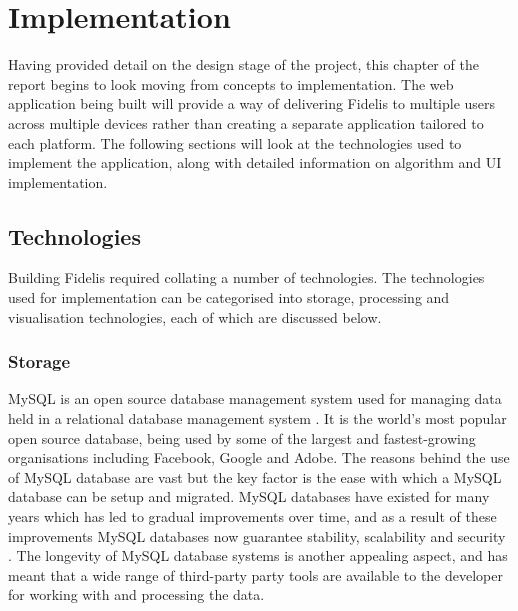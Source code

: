 \chapter{Implementation}
\label{Chapter:Implementation}
Having provided detail on the design stage of the project, this chapter of the report begins to look moving from concepts to implementation. The web application being built will provide a way of delivering Fidelis to multiple users across multiple devices rather than creating a separate application tailored to each platform. The following sections will look at the technologies used to implement the application, along with detailed information on algorithm and UI implementation.

\section{Technologies}
Building Fidelis required collating a number of technologies. The technologies used for implementation can be categorised into storage, processing and visualisation technologies, each of which are discussed below.

\subsection{Storage}
MySQL is an open source database management system used for managing data held in a relational database management system \cite{MySQL:Home}. It is the world's most popular open source database, being used by some of the largest and fastest-growing organisations including Facebook, Google and Adobe. The reasons behind the use of MySQL database are vast but the key factor is the ease with which a MySQL database can be setup and migrated. MySQL databases have existed for many years which has led to gradual improvements over time, and as a result of these improvements MySQL databases now guarantee stability, scalability and security \cite{MySQL:Why}. The longevity of MySQL database systems is another appealing aspect, and has meant that a wide range of third-party party tools are available to the developer for working with and processing the data. 

